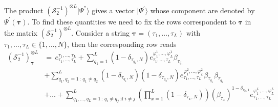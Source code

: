 \documentclass[10pt]{article}
\numberwithin{equation}{section}
\numberwithin{equation}{subsection}
\begin{document}
The product $\left(\mathcal{S}_{2}^{-1}\right)^{\otimes L}|\Psi^{''}\rangle$ gives a vector $|\Psi^{'}\rangle$ whose component are denoted by $\Psi^{'}(\bm{\tau})$. 
To find these quantities we need to fix the rows correspondent to $\bm{\tau}$ in the matrix $\left(\mathcal{S}_{2}^{-1}\right)^{\otimes L}$. Consider a string $\bm{\tau}=(\tau_{1},\ldots,\tau_{L})$ with $\tau_{1},\ldots,\tau_{L}\in \{1,\ldots,N\}$, then the corresponding row reads
\begin{equation}
	\begin{split}
\left(\mathcal{S}_{2}^{-1}\right)^{\otimes L}_{\bm{\tau}}&=\,e_{\tau_{1},\ldots,\tau_{L}}^{\tau_{1},\ldots,\tau_{L}}+\sum_{q_{1}=1}^{L}(1-\delta_{\tau_{q_{1}},N})e_{\tau_{1},\ldots,\tau_{L}}^{\varphi_{1}^{1},\ldots,\varphi_{L}^{1}}\beta_{\tau_{q_{1}}}\\&+\sum_{q_{1},q_{2}=1\,:\,q_{1}\neq q_{2}}^{L}(1-\delta_{\tau_{q_{1}},N})(1-\delta_{\tau_{q_{2}},N})e_{\tau_{1},\ldots,\tau_{L}}^{\varphi_{1}^{2},\ldots,\varphi_{L}^{2}}\beta_{\tau_{q_{1}}}\beta_{\tau_{q_{2}}}
  \\&+
  \ldots+\sum_{q_{1},\ldots,q_{L}=1\,:\,q_{i}\neq q_{j}\;\text{if}\;i\neq j}^{L}\left(\prod_{x=1}^{L}(1-\delta_{\tau_{x},N})\right)\left(\beta_{\tau_{x}}\right)^{1-\delta_{\tau_{x},1}}e_{\tau_{1},\ldots,\tau_{L}}^{\varphi_{1}^{L},\ldots,\varphi_{L}^{L}}
	\end{split}
\end{equation}
\end{document}
